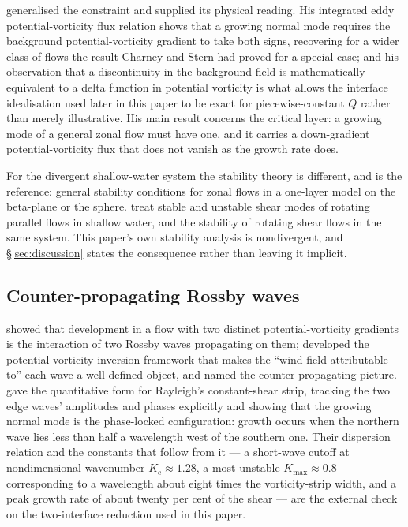 \citet{bretherton1966} generalised the constraint and supplied its physical
reading. His integrated eddy potential-vorticity flux relation shows that a growing
normal mode requires the background potential-vorticity gradient to take both
signs, recovering for a wider class of flows the result Charney and Stern had
proved for a special case; and his observation that a discontinuity in the
background field is mathematically equivalent to a delta function in potential
vorticity is what allows the interface idealisation used later in this paper to be
exact for piecewise-constant $Q$ rather than merely illustrative. His main result
concerns the critical layer: a growing mode of a general zonal flow must have one,
and it carries a down-gradient potential-vorticity flux that does not vanish as the
growth rate does.

For the divergent shallow-water system the stability theory is different, and
\citet{ripa1983} is the reference: general stability conditions for zonal flows in
a one-layer model on the beta-plane or the sphere. \citet{hayashi1987} treat
stable and unstable shear modes of rotating parallel flows in shallow water, and
\citet{knessl1992} the stability of rotating shear flows in the same system.
This paper's own stability analysis is nondivergent, and
\S\ref{sec:discussion} states the consequence rather than leaving it implicit.

\subsection{Counter-propagating Rossby waves}

\citet{bretherton1966} showed that development in a flow with two distinct
potential-vorticity gradients is the interaction of two Rossby waves propagating on
them; \citet{hoskins1985} developed the potential-vorticity-inversion framework
that makes the ``wind field attributable to'' each wave a well-defined object, and
named the counter-propagating picture. \citet{heifetz1999} gave the quantitative
form for Rayleigh's constant-shear strip, tracking the two edge waves' amplitudes
and phases explicitly and showing that the growing normal mode is the phase-locked
configuration: growth occurs when the northern wave lies less than half a
wavelength west of the southern one. Their dispersion relation and the constants
that follow from it --- a short-wave cutoff at nondimensional wavenumber
$K_{\mathrm c} \approx 1.28$, a most-unstable $K_{\max} \approx 0.8$ corresponding
to a wavelength about eight times the vorticity-strip width, and a peak growth rate
of about twenty per cent of the shear --- are the external check on the
two-interface reduction used in this paper.

